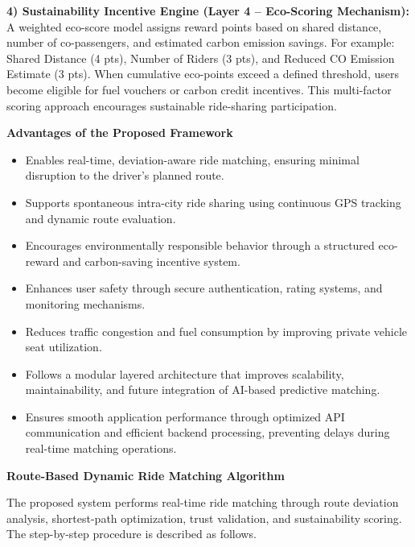 \documentclass[conference]{IEEEtran}
\begin{document}
\vspace{4pt}

\textbf{4) Sustainability Incentive Engine (Layer 4 – Eco-Scoring Mechanism):} A weighted eco-score model assigns reward points based on shared distance, number of co-passengers, and estimated carbon emission savings. For example:
Shared Distance (4 pts), Number of Riders (3 pts), and Reduced CO Emission Estimate (3 pts). When cumulative eco-points exceed a defined threshold, users become eligible for fuel vouchers or carbon credit incentives. This multi-factor scoring approach encourages sustainable ride-sharing participation.

\vspace{6pt}

\textbf{Advantages of the Proposed Framework}

\begin{itemize}
\item Enables real-time, deviation-aware ride matching, ensuring minimal disruption to the driver’s planned route.
\item Supports spontaneous intra-city ride sharing using continuous GPS tracking and dynamic route evaluation.
\item Encourages environmentally responsible behavior through a structured eco-reward and carbon-saving incentive system.
\item Enhances user safety through secure authentication, rating systems, and monitoring mechanisms.
\item Reduces traffic congestion and fuel consumption by improving private vehicle seat utilization.
\item Follows a modular layered architecture that improves scalability, maintainability, and future integration of AI-based predictive matching.
\item Ensures smooth application performance through optimized API communication and efficient backend processing, preventing delays during real-time matching operations.
\end{itemize}

\vspace{3pt}

\textbf{Route-Based Dynamic Ride Matching Algorithm}

The proposed system performs real-time ride matching through route deviation analysis, shortest-path optimization, trust validation, and sustainability scoring. The step-by-step procedure is described as follows.
\end{document}
